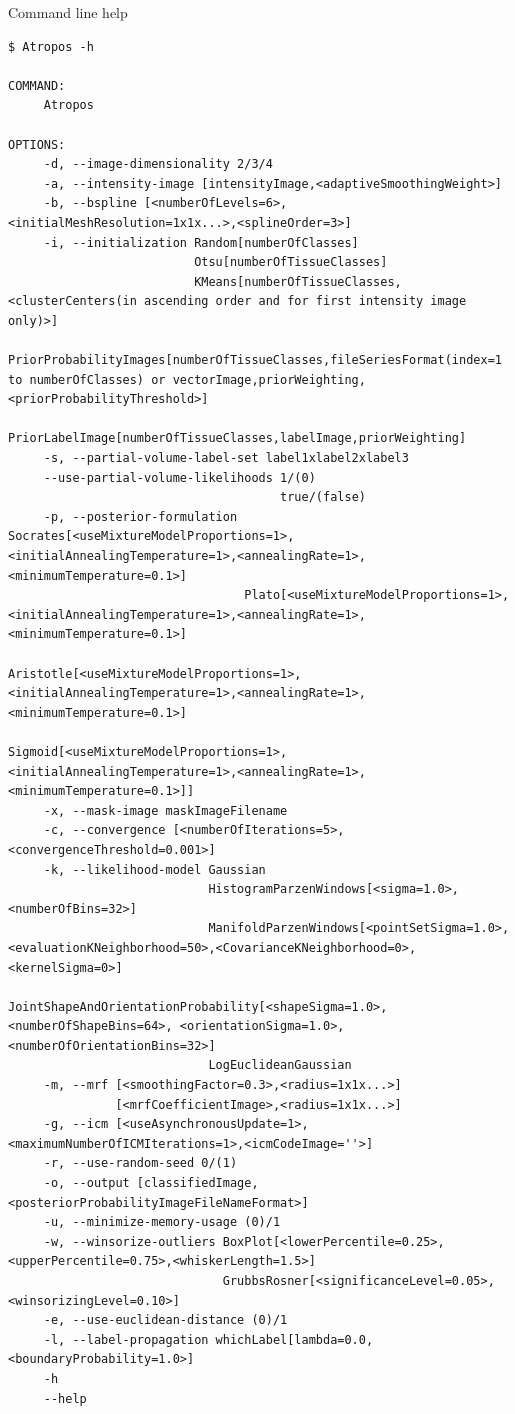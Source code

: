 \documentclass[ignorenonframetext,]{beamer}
\begin{document}
\begin{frame}[fragile]{Command line help}

\begin{verbatim}
$ Atropos -h

COMMAND:
     Atropos

OPTIONS:
     -d, --image-dimensionality 2/3/4
     -a, --intensity-image [intensityImage,<adaptiveSmoothingWeight>]
     -b, --bspline [<numberOfLevels=6>,<initialMeshResolution=1x1x...>,<splineOrder=3>]
     -i, --initialization Random[numberOfClasses]
                          Otsu[numberOfTissueClasses]
                          KMeans[numberOfTissueClasses,<clusterCenters(in ascending order and for first intensity image only)>]
                          PriorProbabilityImages[numberOfTissueClasses,fileSeriesFormat(index=1 to numberOfClasses) or vectorImage,priorWeighting,<priorProbabilityThreshold>]
                          PriorLabelImage[numberOfTissueClasses,labelImage,priorWeighting]
     -s, --partial-volume-label-set label1xlabel2xlabel3
     --use-partial-volume-likelihoods 1/(0)
                                      true/(false)
     -p, --posterior-formulation Socrates[<useMixtureModelProportions=1>,<initialAnnealingTemperature=1>,<annealingRate=1>,<minimumTemperature=0.1>]
                                 Plato[<useMixtureModelProportions=1>,<initialAnnealingTemperature=1>,<annealingRate=1>,<minimumTemperature=0.1>]
                                 Aristotle[<useMixtureModelProportions=1>,<initialAnnealingTemperature=1>,<annealingRate=1>,<minimumTemperature=0.1>]
                                 Sigmoid[<useMixtureModelProportions=1>,<initialAnnealingTemperature=1>,<annealingRate=1>,<minimumTemperature=0.1>]]
     -x, --mask-image maskImageFilename
     -c, --convergence [<numberOfIterations=5>,<convergenceThreshold=0.001>]
     -k, --likelihood-model Gaussian
                            HistogramParzenWindows[<sigma=1.0>,<numberOfBins=32>]
                            ManifoldParzenWindows[<pointSetSigma=1.0>,<evaluationKNeighborhood=50>,<CovarianceKNeighborhood=0>,<kernelSigma=0>]
                            JointShapeAndOrientationProbability[<shapeSigma=1.0>,<numberOfShapeBins=64>, <orientationSigma=1.0>, <numberOfOrientationBins=32>]
                            LogEuclideanGaussian
     -m, --mrf [<smoothingFactor=0.3>,<radius=1x1x...>]
               [<mrfCoefficientImage>,<radius=1x1x...>]
     -g, --icm [<useAsynchronousUpdate=1>,<maximumNumberOfICMIterations=1>,<icmCodeImage=''>]
     -r, --use-random-seed 0/(1)
     -o, --output [classifiedImage,<posteriorProbabilityImageFileNameFormat>]
     -u, --minimize-memory-usage (0)/1
     -w, --winsorize-outliers BoxPlot[<lowerPercentile=0.25>,<upperPercentile=0.75>,<whiskerLength=1.5>]
                              GrubbsRosner[<significanceLevel=0.05>,<winsorizingLevel=0.10>]
     -e, --use-euclidean-distance (0)/1
     -l, --label-propagation whichLabel[lambda=0.0,<boundaryProbability=1.0>]
     -h
     --help
\end{verbatim}

\end{frame}
\end{document}
